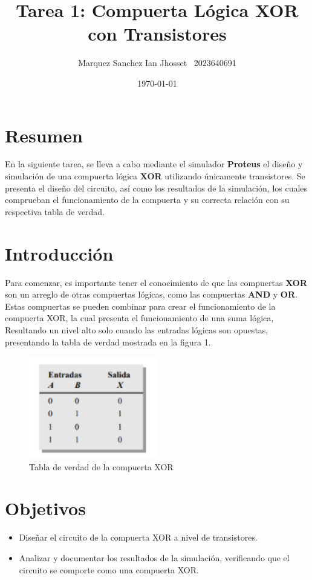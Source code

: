 \documentclass{article}
\title{Tarea 1: Compuerta Lógica XOR con Transistores}
\author{Marquez Sanchez Ian Jhosset \ \small 2023640691}
\date{\today}
\begin{document}
\maketitle
\thispagestyle{fancy}

\section{Resumen}
\label{sec:resumen}
En la siguiente tarea, se lleva a cabo mediante el simulador \textbf{Proteus} el diseño y simulación de una compuerta lógica \textbf{XOR} utilizando únicamente transistores. Se presenta el diseño del circuito, así como los resultados de la simulación, los cuales comprueban el funcionamiento de la compuerta y su correcta relación con su respectiva tabla de verdad.

\section{Introducción}
\label{sec:introduccion}
Para comenzar, es importante tener el conocimiento de que las compuertas \textbf{XOR} son un arreglo de otras compuertas lógicas, como las compuertas \textbf{AND} y \textbf{OR}. Estas compuertas se pueden combinar para crear el funcionamiento de la compuerta XOR, la cual presenta el funcionamiento de una suma lógica, Resultando un nivel alto solo cuando las entradas lógicas son opuestas, presentando la tabla de verdad mostrada en la figura 1. \cite{floyd2006}
\begin{figure}[H]
\centering  
\includegraphics[width=0.5\textwidth]{IMG/TablaVerdadXOR.png}
\caption{Tabla de verdad de la compuerta XOR}
\label{fig:tabla_verdad_xor}
\end{figure}

\section{Objetivos}
\label{sec:objetivos}
\begin{itemize}
\item Diseñar el circuito de la compuerta XOR a nivel de transistores.
\item Analizar y documentar los resultados de la simulación, verificando que el circuito se comporte como una compuerta XOR.
\end{itemize}
\end{document}
